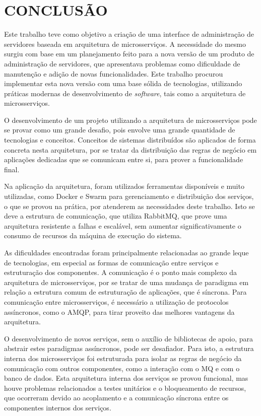 \chapter{CONCLUSÃO}
\label{chp:conclusao}

Este trabalho teve como objetivo a criação de uma interface de administração
de servidores baseada em arquitetura de microsserviços. A necessidade do
mesmo surgiu com base em um planejamento feito para a nova versão de um
produto de administração de servidores, que apresentava problemas como
dificuldade de manutenção e adição de novas funcionalidades. Este trabalho
procurou implementar esta nova versão com uma base sólida de tecnologias,
utilizando práticas modernas de desenvolvimento de \emph{software}, tais como
a arquitetura de microsserviços.

O desenvolvimento de um projeto utilizando a arquitetura de microsserviços
pode se provar como um grande desafio, pois envolve uma grande quantidade
de tecnologias e conceitos. Conceitos de sistemas distribuídos são aplicados
de forma concreta nesta arquitetura, por se tratar da distribuição das regras
de negócio em aplicações dedicadas que se comunicam entre si, para prover
a funcionalidade final.

Na aplicação da arquitetura, foram utilizados ferramentas disponíveis e
muito utilizadas, como Docker e Swarm para gerenciamento e distribuição
dos serviços, o que se provou na prática, por atenderem as necessidades
deste trabalho. Isto se deve a estrutura de comunicação, que utiliza RabbitMQ,
que prove uma arquitetura resistente a falhas e escalável, sem aumentar
significativamente o consumo de recursos da máquina de execução do sistema.

As dificuldades encontradas foram principalmente relacionadas ao grande leque
de tecnologias, em especial as formas de comunicação entre serviços e
estruturação dos componentes. A comunicação é o ponto mais complexo
da arquitetura de microsserviços, por se tratar de uma mudança de paradigma
em relação a estrutura comum de estruturação de aplicações, que é síncrona.
Para comunicação entre microsserviços, é necessário a utilização de protocolos
assíncronos, como o \ac{AMQP}, para tirar proveito das melhores vantagens
da arquitetura.

O desenvolvimento de novos serviços, sem o auxílio de bibliotecas de apoio,
para abstrair estes paradigmas assíncronos, pode ser desafiador. Para isto,
a estrutura interna dos microsserviços foi estruturada para isolar as regras
de negócio da comunicação com outros componentes, como a interação
com o \ac{MQ} e com o banco de dados. Esta arquitetura interna dos serviços
se provou funcional, mas houve problemas relacionados a testes unitários
e o bloqueamento de recursos, que ocorreram devido ao acoplamento e a
comunicação síncrona entre os componentes internos dos serviços.

